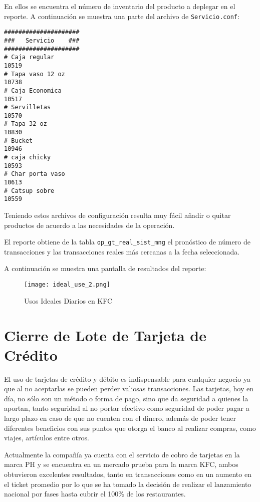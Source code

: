En ellos se encuentra el número de inventario del producto a deplegar en el reporte. A continuación se muestra una parte del archivo de \texttt{Servicio.conf}:

\begin{Verbatim}[fontsize=\small]
#####################
###   Servicio    ###
#####################
# Caja regular
10519
# Tapa vaso 12 oz
10738
# Caja Economica
10517
# Servilletas
10570
# Tapa 32 oz
10830
# Bucket
10946
# caja chicky
10593
# Char porta vaso
10613
# Catsup sobre
10559
\end{Verbatim}

Teniendo estos archivos de configuración resulta muy fácil añadir o quitar productos de acuerdo a las necesidades de la operación.

El reporte obtiene de la tabla \texttt{op\_gt\_real\_sist\_mng} el pronóstico de número de transacciones y las transacciones reales más cercanas a la fecha seleccionada.

A continuación se muestra una pantalla de resultados del reporte:

\begin{figure}[htb]
 \begin{center}
  \texttt{[image: ideal\_use\_2.png]}
 \end{center}
 \caption{Usos Ideales Diarios en KFC}
 \label{fig:usos_ideales_kfc}
\end{figure}

\section{Cierre de Lote de Tarjeta de Crédito}
\label{sec:cierre_lote}

El uso de tarjetas de crédito y débito es indispensable para cualquier negocio ya que al no aceptarlas se pueden perder valiosas transacciones. Las tarjetas, hoy en día, no sólo son un método o forma de pago, sino que da seguridad a quienes la aportan, tanto seguridad al no portar efectivo como seguridad de poder pagar a largo plazo en caso de que no cuenten con el dinero, además de poder tener diferentes beneficios con sus puntos que otorga el banco al realizar compras, como viajes, artículos entre otros.

Actualmente la compañía ya cuenta con el servicio de cobro de tarjetas en la marca PH y se encuentra en un mercado prueba para la marca KFC, ambos obtuvieron excelentes resultados, tanto en transacciones como en un aumento en el ticket promedio por lo que se ha tomado la
decisión de realizar el lanzamiento nacional por fases hasta cubrir el 100\% de los restaurantes.

